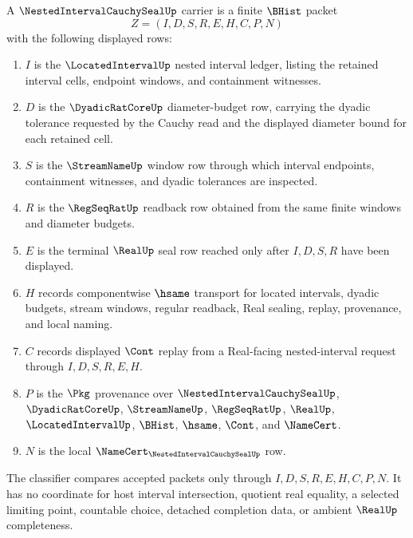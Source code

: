 \begin{definition}
\label{def:nested-interval-cauchy-seal-carrier}
A $\NestedIntervalCauchySealUp$ carrier is a finite $\BHist$ packet
$$
Z=(I,D,S,R,E,H,C,P,N)
$$
with the following displayed rows:
\begin{enumerate}
\item $I$ is the $\LocatedIntervalUp$ nested interval ledger, listing the retained interval cells, endpoint windows, and containment witnesses.
\item $D$ is the $\DyadicRatCoreUp$ diameter-budget row, carrying the dyadic tolerance requested by the Cauchy read and the displayed diameter bound for each retained cell.
\item $S$ is the $\StreamNameUp$ window row through which interval endpoints, containment witnesses, and dyadic tolerances are inspected.
\item $R$ is the $\RegSeqRatUp$ readback row obtained from the same finite windows and diameter budgets.
\item $E$ is the terminal $\RealUp$ seal row reached only after $I,D,S,R$ have been displayed.
\item $H$ records componentwise $\hsame$ transport for located intervals, dyadic budgets, stream windows, regular readback, Real sealing, replay, provenance, and local naming.
\item $C$ records displayed $\Cont$ replay from a Real-facing nested-interval request through $I,D,S,R,E,H$.
\item $P$ is the $\Pkg$ provenance over $\NestedIntervalCauchySealUp$, $\DyadicRatCoreUp$, $\StreamNameUp$, $\RegSeqRatUp$, $\RealUp$, $\LocatedIntervalUp$, $\BHist$, $\hsame$, $\Cont$, and $\NameCert$.
\item $N$ is the local $\NameCert_{\NestedIntervalCauchySealUp}$ row.
\end{enumerate}
The classifier compares accepted packets only through $I,D,S,R,E,H,C,P,N$. It has no coordinate for host interval intersection, quotient real equality, a selected limiting point, countable choice, detached completion data, or ambient $\RealUp$ completeness.
\end{definition}

